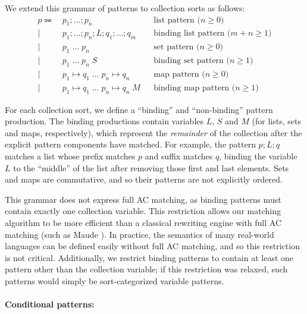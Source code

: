 \documentclass{article}
\theoremstyle{definition}
\begin{document}
We extend this grammar of patterns to collection sorts as follows:
\begin{align*}
  p \Coloneqq & \: p_1 ; \dots ; p_n                            && \text{list pattern ($n \geq 0$)} \\
    \mid      & \: p_1 ; \dots ; p_n ; L ; q_1 ; \dots ; q_m
              && \text{binding list pattern ($m + n \geq 1$)} \\
    \mid      & \: p_1 \; \dots \; p_n                          && \text{set pattern ($n \geq 0$)} \\
    \mid      & \: p_1 \; \dots \; p_n \; S                   
              && \text{binding set pattern ($n \geq 1$)} \\
    \mid      & \: p_1 \mapsto q_1 \; \dots \; p_n \mapsto q_n  && \text{map pattern ($n \geq 0$)} \\
    \mid      & \: p_1 \mapsto q_1 \; \dots \; p_n \mapsto q_n \; M
              && \text{binding map pattern ($n \geq 1$)}
\end{align*}

For each collection sort, we define a ``binding'' and ``non-binding'' pattern
production. The binding productions contain variables $ L $, $ S $ and $ M $
(for lists, sets and maps, respectively), which represent the \emph{remainder}
of the collection after the explicit pattern components have matched. For
example, the pattern $ p ; L ; q $ matches a list whose prefix matches $ p $ and
suffix matches $ q $, binding the variable $ L $ to the ``middle'' of the list
after removing those first and last elements. Sets and maps are commutative, and
so their patterns are not explicitly ordered.

This grammar does not express full AC matching, as binding patterns must contain
exactly one collection variable. This restriction allows our matching algorithm
to be more efficient than a classical rewriting engine with full AC matching
(such as Maude \cite{Clavel2007}). In practice, the
semantics of many real-world languages can be defined easily without full AC
matching, and so this restriction is not critical. Additionally, we restrict
binding patterns to contain at least one pattern other than the collection
variable; if this restriction was relaxed, such patterns would simply be
sort-categorized variable patterns.

\paragraph{Conditional patterns:}
\end{document}
